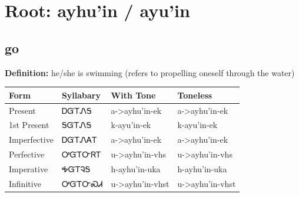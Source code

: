 \documentclass{article}%
\begin{document}
%
\normalsize%
\section*{Root: ayhu'in / ayu'in}%
\subsection*{go}%
\textbf{Definition: }%
he/she is swimming (refers to propelling oneself through the water)%
\\[0.5em]%
\begin{tabular}{|l|l|l|l|}%
\hline%
\textbf{Form}&\textbf{Syllabary}&\textbf{With Tone}&\textbf{Toneless}\\%
\hline%
Present&ᎠᏳᎢᏁᎦ&a{-}>ayhu'in{-}ek&a{-}>ayhu'in{-}ek\\%
1st Present&ᎦᏳᎢᏁᎦ&k{-}ayu'in{-}ek&k{-}ayu'in{-}ek\\%
Imperfective&ᎠᏳᎢᏁᎪᎢ&a{-}>ayhu'in{-}ek&a{-}>ayhu'in{-}ek\\%
Perfective&ᎤᏳᎢᏅᏒᎢ&u{-}>ayhu'in{-}vhs&u{-}>ayhu'in{-}vhs\\%
Imperative&ᎭᏳᎢᎸᎦ&h{-}ayhu'in{-}uka&h{-}ayhu'in{-}uka\\%
Infinitive&ᎤᏳᎢᏅᏍᏗ&u{-}>ayhu'in{-}vhst&u{-}>ayhu'in{-}vhst\\%
\hline%
\end{tabular}%
\\[1em]%
\end{document}
